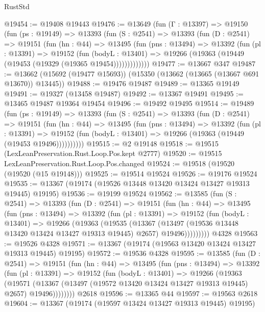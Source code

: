 \begin{lexlean}{RustStd}
\begin{coremodule}
@19454 := @19408 @19443
@19476 := @13649
    (fun (Γ : @13397) =>
    @19150
      (fun (ps : @19149) =>
      @13393
        (fun (S : @2541) =>
        @13393
          (fun (D : @2541) =>
          @19151
            (fun (hn : @44) =>
            @13495
              (fun (pns : @13494) =>
              @13392
                (fun (pl : @13391) =>
                @19152
                  (fun (bodyL : @13401) =>
                  @19266 (@19363 (@19449 (@19453 (@19329 (@19365 @19454)))))))))))))
@19477 := @13667 @347
@19487 := @13662 (@15692 (@19477 @15693)) (@15350 (@13662 (@13665 (@13667 @691 @13670)) @13445))
@19488 := @19476 @19487
@19489 := @13365 @19149
@19491 := @19327 (@13458 @19487)
@19492 := @13367 @19491
@19495 := @13465 @19487 @19364 @19454
@19496 := @19492 @19495
@19514 := @19489
    (fun (ps : @19149) =>
    @13393
      (fun (S : @2541) =>
      @13393
        (fun (D : @2541) =>
        @19151
          (fun (hn : @44) =>
          @13495
            (fun (pns : @13494) =>
            @13392
              (fun (pl : @13391) =>
              @19152 (fun (bodyL : @13401) => @19266 (@19363 (@19449 (@19453 @19496))))))))))
@19515 := @2 @19148
@19518 := @19515 (LexLeanPreservation.Rust.Loop.Pos.kept @2777)
@19520 := @19515 LexLeanPreservation.Rust.Loop.Pos.changed
@19524 := @19518 (@19520 (@19520 (@15 @19148)))
@19525 := @19514 @19524
@19526 := @19176 @19524
@19535 := @13367 (@19174 (@19526 @13448 @13420 @13424 @13427 @19313 @19445) @19195)
@19536 := @19199 @19524
@19562 := @13585
    (fun (S : @2541) =>
    @13393
      (fun (D : @2541) =>
      @19151
        (fun (hn : @44) =>
        @13495
          (fun (pns : @13494) =>
          @13392
            (fun (pl : @13391) =>
            @19152
              (fun (bodyL : @13401) =>
              @19266
                (@19363
                  (@19535
                    (@13367
                      (@13497 (@19536 @13448 @13420 @13424 @13427 @19313 @19445) @2657)
                      @19496)))))))))
    @4328
@19563 := @19526 @4328
@19571 := @13367 (@19174 (@19563 @13420 @13424 @13427 @19313 @19445) @19195)
@19572 := @19536 @4328
@19595 := @13585
    (fun (D : @2541) =>
    @19151
      (fun (hn : @44) =>
      @13495
        (fun (pns : @13494) =>
        @13392
          (fun (pl : @13391) =>
          @19152
            (fun (bodyL : @13401) =>
            @19266
              (@19363
                (@19571
                  (@13367 (@13497 (@19572 @13420 @13424 @13427 @19313 @19445) @2657) @19496))))))))
    @2618
@19596 := @13365 @44
@19597 := @19563 @2618
@19604 := @13367 (@19174 (@19597 @13424 @13427 @19313 @19445) @19195)

\end{coremodule}
\end{lexlean}
